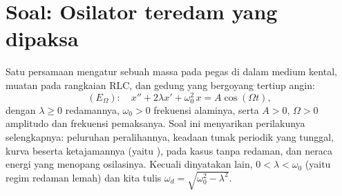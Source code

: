 \section{Soal: Osilator teredam yang dipaksa}

\begin{problem}\label{pb:b1:diffeq:1}
Satu persamaan mengatur sebuah massa pada pegas di dalam medium kental,
muatan pada rangkaian RLC, dan gedung yang bergoyang tertiup angin:
\[
(E_\Omega)\colon\quad
x'' + 2\lambda x' + \omega_0^2\,x = A\cos(\Omega t),
\]
dengan $\lambda \geq 0$ redamannya, $\omega_0 > 0$ frekuensi
alaminya, serta $A > 0$, $\Omega > 0$ amplitudo dan frekuensi
pemaksanya. Soal ini menyarikan perilakunya selengkapnya: peluruhan
peralihannya, keadaan tunak periodik yang tunggal, kurva 
beserta ketajamannya (yaitu \emph{}),  pada
kasus tanpa redaman, dan neraca energi yang menopang
osilasinya.
Kecuali dinyatakan lain, $0 < \lambda < \omega_0$ (yaitu regim redaman
lemah) dan kita tulis $\omega_d = \sqrt{\omega_0^2 - \lambda^2}$.


\end{problem}
